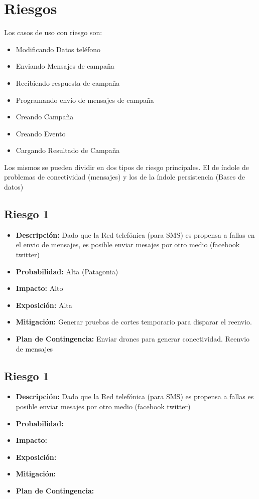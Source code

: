 \documentclass[a4paper, 11pt]{article}
\begin{document}
\section{Riesgos}

Los casos de uso con riesgo son:
\begin{itemize}
\item Modificando Datos teléfono
\item Enviando Mensajes de campaña
\item Recibiendo respuesta de campaña
\item Programando envio de mensajes de campaña
\item Creando Campaña
\item Creando Evento
\item Cargando Resultado de Campaña
\end{itemize}
Los mismos se pueden dividir en dos tipos de riesgo principales. El de índole de problemas de conectividad (mensajes) y los de la índole persistencia (Bases de datos)

\subsection{Riesgo 1}
\begin{itemize}

\item \textbf{Descripci\'on:} Dado que la Red telefónica (para SMS) es propensa a fallas en el envio de mensajes, es posible enviar mesajes por otro medio (facebook twitter)
\item \textbf{Probabilidad:} Alta (Patagonia)
\item \textbf{Impacto:} Alto
\item \textbf{Exposici\'on:} Alta
\item \textbf{Mitigaci\'on:} Generar pruebas de cortes temporario para disparar el reenvio.
\item \textbf{Plan de Contingencia:} Enviar drones para generar conectividad. Reenvio de mensajes
\end{itemize}


\subsection{Riesgo 1}
\begin{itemize}

\item \textbf{Descripci\'on:} Dado que la Red telefónica (para SMS) es propensa a fallas es posible enviar mesajes por otro medio (facebook twitter)
\item \textbf{Probabilidad:}
\item \textbf{Impacto:}
\item \textbf{Exposici\'on:}
\item \textbf{Mitigaci\'on:}
\item \textbf{Plan de Contingencia:}
\end{itemize}
\end{document}
